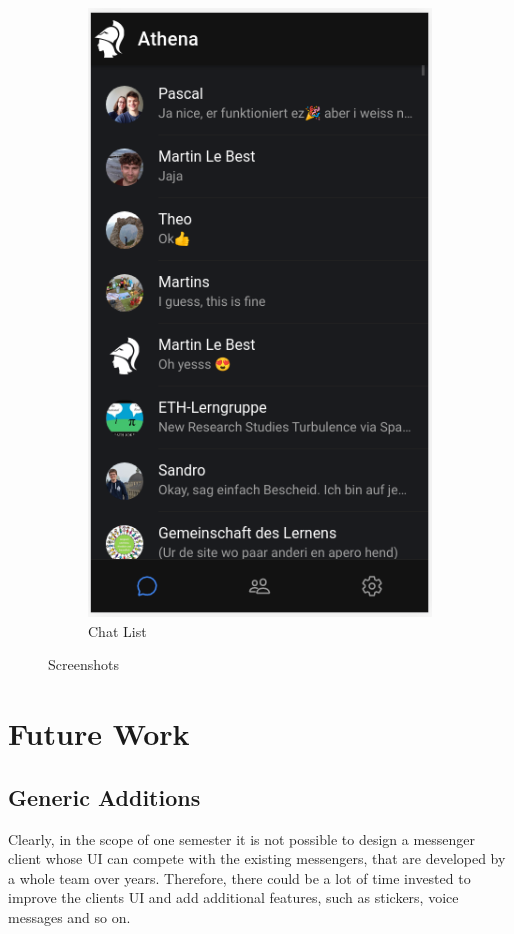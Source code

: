 \documentclass[a4paper, oneside]{discothesis}
\begin{document}
\begin{figure}[h]
\begin{subfigure}{.5\textwidth}
  \includegraphics[width=.8\linewidth]{figures/chats.png}
  \caption{Chat List}
  \label{fig:chats}
\end{subfigure}
\caption{Screenshots}
\label{fig:screenshots}
\end{figure}


\chapter{Future Work}
\label{sec:future_work}

\section{Generic Additions}

Clearly, in the scope of one semester it is not possible to design a messenger client whose UI can compete with the existing messengers, that are developed by a whole team over years. Therefore, there could be a lot of time invested to improve the clients UI and add additional features, such as stickers, voice messages and so on.
\end{document}
